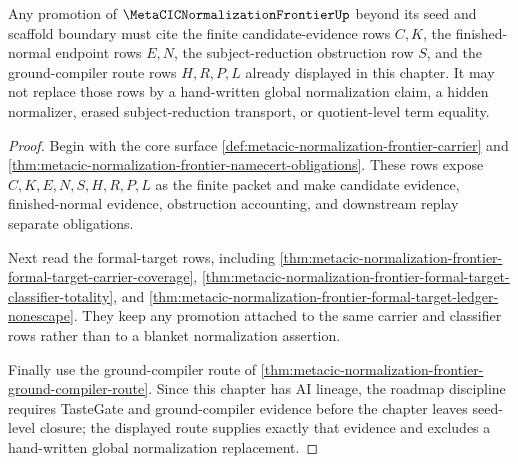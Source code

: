 \begin{theorem}
\label{thm:metacic-normalization-frontier-tastegate-route}
Any promotion of $\MetaCICNormalizationFrontierUp$ beyond its seed and scaffold boundary must cite the finite candidate-evidence rows $C,K$, the finished-normal endpoint rows $E,N$, the subject-reduction obstruction row $S$, and the ground-compiler route rows $H,R,P,L$ already displayed in this chapter. It may not replace those rows by a hand-written global normalization claim, a hidden normalizer, erased subject-reduction transport, or quotient-level term equality.
\end{theorem}
\begin{proof}
Begin with the core surface \autoref{def:metacic-normalization-frontier-carrier} and \autoref{thm:metacic-normalization-frontier-namecert-obligations}. These rows expose $C,K,E,N,S,H,R,P,L$ as the finite packet and make candidate evidence, finished-normal evidence, obstruction accounting, and downstream replay separate obligations.

Next read the formal-target rows, including \autoref{thm:metacic-normalization-frontier-formal-target-carrier-coverage}, \autoref{thm:metacic-normalization-frontier-formal-target-classifier-totality}, and \autoref{thm:metacic-normalization-frontier-formal-target-ledger-nonescape}. They keep any promotion attached to the same carrier and classifier rows rather than to a blanket normalization assertion.

Finally use the ground-compiler route of \autoref{thm:metacic-normalization-frontier-ground-compiler-route}. Since this chapter has AI lineage, the roadmap discipline requires TasteGate and ground-compiler evidence before the chapter leaves seed-level closure; the displayed route supplies exactly that evidence and excludes a hand-written global normalization replacement.
\end{proof}

